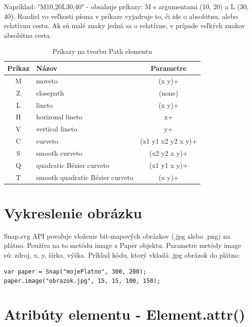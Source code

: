 Napríklad: "M10,20L30,40" - obsahuje príkazy: M s argumentami (10, 20) a L (30, 40). Rozdiel vo veľkosti písma v príkaze vyjadruje to, či ide o absolútnu, alebo relatívnu cestu. Ak sú malé znaky jedná sa o relatívne, v prípade veľkých znakov absolútna cesta. 


\begin{center}
	\begin{table}[H]
		\begin{center}
			\begin{tabular}{|c|l|c|}
				\hline \textbf{Príkaz} & \textbf{Názov} & \textbf{Parametre} \\
				\hline
				\hline M & moveto & (x y)+ \\ 
				\hline Z & closepath & (none) \\ 
				\hline L & lineto & (x y)+ \\ 
				\hline H & horizonal lineto & x+ \\ 
				\hline V & vertical lineto & y+ \\ 
				\hline C & curveto & (x1 y1 x2 y2 x y)+ \\ 
				\hline S & smooth curveto & (x2 y2 x y)+ \\ 
				\hline Q & quadratic Bézier curveto & (x1 y1 x y)+ \\ 
				\hline T & smooth quadratic Bézier curveto & (x y)+ \\ 
				\hline 
			\end{tabular} 
		\end{center}
		\caption{Príkazy na tvorbu Path elementu}
		\label{prikazy:Path}
	\end{table}
\end{center}


\section{Vykreslenie obrázku}
Snap.svg API povoľuje vloženie bit-mapových obrázkov (.jpg alebo .png) na plátno. Používa na to metódu image z Paper objektu. Parametre metódy image sú: zdroj, x, y, šírka, výška. Príklad kódu, ktorý vkladá .jpg obrázok do plátna:

\begin{lstlisting}
var paper = Snap("mojePlatno", 300, 200);
paper.image("obrazok.jpg", 15, 15, 100, 150);
\end{lstlisting}


\section{Atribúty elementu - Element.attr()}

